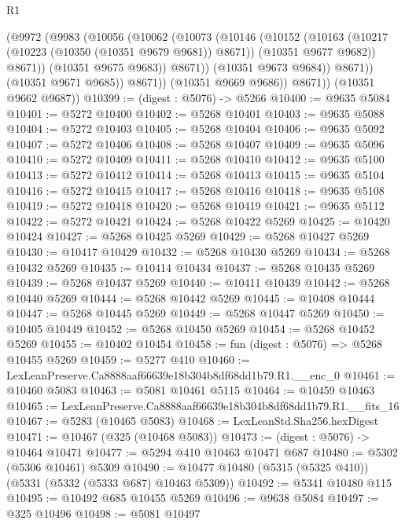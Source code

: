 \begin{lexlean}{R1}
\begin{coremodule}
                    (@9972
                      (@9983
                        (@10056
                          (@10062
                            (@10073
                              (@10146
                                (@10152
                                  (@10163
                                    (@10217 (@10223 (@10350 (@10351 @9679 @9681)) @8671))
                                    (@10351 @9677 @9682))
                                  @8671))
                              (@10351 @9675 @9683))
                            @8671))
                        (@10351 @9673 @9684))
                      @8671))
                  (@10351 @9671 @9685))
                @8671))
            (@10351 @9669 @9686))
          @8671))
      (@10351 @9662 @9687))
@10399 := (digest : @5076) -> @5266
@10400 := @9635 @5084
@10401 := @5272 @10400
@10402 := @5268 @10401
@10403 := @9635 @5088
@10404 := @5272 @10403
@10405 := @5268 @10404
@10406 := @9635 @5092
@10407 := @5272 @10406
@10408 := @5268 @10407
@10409 := @9635 @5096
@10410 := @5272 @10409
@10411 := @5268 @10410
@10412 := @9635 @5100
@10413 := @5272 @10412
@10414 := @5268 @10413
@10415 := @9635 @5104
@10416 := @5272 @10415
@10417 := @5268 @10416
@10418 := @9635 @5108
@10419 := @5272 @10418
@10420 := @5268 @10419
@10421 := @9635 @5112
@10422 := @5272 @10421
@10424 := @5268 @10422 @5269
@10425 := @10420 @10424
@10427 := @5268 @10425 @5269
@10429 := @5268 @10427 @5269
@10430 := @10417 @10429
@10432 := @5268 @10430 @5269
@10434 := @5268 @10432 @5269
@10435 := @10414 @10434
@10437 := @5268 @10435 @5269
@10439 := @5268 @10437 @5269
@10440 := @10411 @10439
@10442 := @5268 @10440 @5269
@10444 := @5268 @10442 @5269
@10445 := @10408 @10444
@10447 := @5268 @10445 @5269
@10449 := @5268 @10447 @5269
@10450 := @10405 @10449
@10452 := @5268 @10450 @5269
@10454 := @5268 @10452 @5269
@10455 := @10402 @10454
@10458 := fun (digest : @5076) => @5268 @10455 @5269
@10459 := @5277 @410
@10460 := LexLeanPreserve.Ca8888aaf66639e18b304b8df68dd1b79.R1.__enc_0
@10461 := @10460 @5083
@10463 := @5081 @10461 @5115
@10464 := @10459 @10463
@10465 := LexLeanPreserve.Ca8888aaf66639e18b304b8df68dd1b79.R1.__fits_16
@10467 := @5283 (@10465 @5083)
@10468 := LexLeanStd.Sha256.hexDigest
@10471 := @10467 (@325 (@10468 @5083))
@10473 := (digest : @5076) -> @10464 @10471
@10477 := @5294 @410 @10463 @10471 @687
@10480 := @5302 (@5306 @10461) @5309
@10490 := @10477 @10480 (@5315 (@5325 @410)) (@5331 (@5332 (@5333 @687) @10463 @5309))
@10492 := @5341 @10480 @115
@10495 := @10492 @685 @10455 @5269
@10496 := @9638 @5084
@10497 := @325 @10496
@10498 := @5081 @10497

\end{coremodule}
\end{lexlean}
